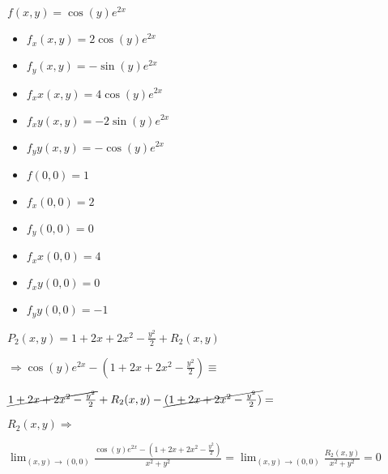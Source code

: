 \documentclass[../parcial.tex]{subfiles}
\begin{document}
    $f(x,y) = \cos(y)e^{2x}$

    \begin{itemize}
        \item $f_x(x,y) = 2\cos(y)e^{2x}$
        \item $f_y(x,y) = -\sin(y)e^{2x}$
        \item $f_xx(x,y) = 4\cos(y)e^{2x}$
        \item $f_xy(x,y) = -2\sin(y)e^{2x}$
        \item $f_yy(x,y) = -\cos(y)e^{2x}$
    \end{itemize}

    \begin{itemize}
        \item $f(0,0) = 1$
        \item $f_x(0,0) = 2$
        \item $f_y(0,0) = 0$
        \item $f_xx(0,0) = 4$
        \item $f_xy(0,0) = 0$
        \item $f_yy(0,0) = -1$
    \end{itemize}

    $P_2(x,y) = 1 + 2x + 2x^2 - \frac{y^2}{2} + R_2(x,y)$

    $\Rightarrow \cos(y)e^{2x} - (1 + 2x + 2x^2 - \frac{y^2}{2}) \equiv $

    $ \cancel{1 + 2x + 2x^2 - \frac{y^2}{2}} + R_2(x,y) - \cancel{(1 + 2x + 2x^2 - \frac{y^2}{2})} = $

    $ R_2(x,y) \Rightarrow$

    $\lim_{(x,y) \to (0,0)} \frac{\cos(y)e^{2x} - (1 + 2x + 2x^2 - \frac{y^2}{2})}{x^2+y^2} = \lim_{(x,y) \to (0,0)} \frac{R_2(x,y)}{x^2+y^2} = 0$
\end{document}
